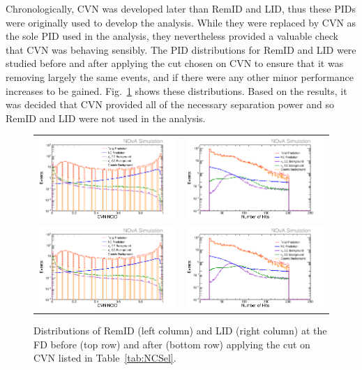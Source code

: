 Chronologically, CVN was developed later than RemID and LID, thus these PIDs were originally used to develop the analysis. While they were replaced by CVN as the sole PID used in the analysis, they nevertheless provided a valuable check that CVN was behaving sensibly. The PID distributions for RemID and LID were studied before and after applying the cut chosen on CVN to ensure that it was removing largely the same events, and if there were any other minor performance increases to be gained. Fig.~\ref{fig:NCSelRemLID} shows these distributions. Based on the results, it was decided that CVN provided all of the necessary separation power and so RemID and LID were not used in the analysis.
\begin{figure}[h]
  \centering
  \begin{tabular}{c c}
    \includegraphics[width=.48\textwidth]{figures/NP1CVNC.png} &
    \includegraphics[width=.48\textwidth]{figures/NP1NHit.png} \\
    \includegraphics[width=.48\textwidth]{figures/NP1CVNC.png} &
    \includegraphics[width=.48\textwidth]{figures/NP1NHit.png} \\
  \end{tabular}
  \caption[RemID and LID Distributions]{Distributions of RemID (left column) and LID (right column) at the FD before (top row) and after (bottom row) applying the cut on CVN listed in Table~\ref{tab:NCSel}.}
  \label{fig:NCSelRemLID}
\end{figure}

